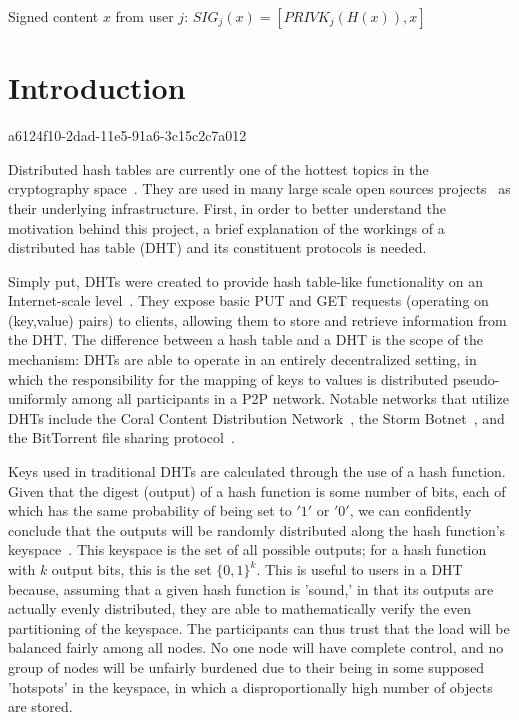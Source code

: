\documentclass[12pt]{article}
\begin{document}
Signed content $x$ from user $j$: $SIG_j(x) = \left[ PRIVK_j( H(x) ), x \right]$

\section{Introduction}
a6124f10-2dad-11e5-91a6-3c15c2c7a012\par Distributed hash tables are currently one of the hottest topics in the cryptography space~\cite{Stoica:2001dj,Rowstron:2001ea,Ratnasamy:2001wn}. They are used in many large scale open sources projects~\cite{Freitas:2013tb,Xu:2010vs,Perfitt:2010fh} as their underlying infrastructure. First, in order to better understand the motivation behind this project, a brief explanation of the workings of a distributed has table (DHT) and its constituent protocols is needed.

\par Simply put, DHTs were created to provide hash table-like functionality on an Internet-scale level~\cite{Ratnasamy:2001wn}. They expose basic PUT and GET requests (operating on (key,value) pairs) to clients, allowing them to store and retrieve information from the DHT. The difference between a hash table and a DHT is the scope of the mechanism: DHTs are able to operate in an entirely decentralized setting, in which the responsibility for the mapping of keys to values is distributed pseudo-uniformly among all participants in a P2P network. Notable networks that utilize DHTs include the Coral Content Distribution Network~\cite{Freedman:2004vb}, the Storm Botnet~\cite{Holz:2008uk}, and the BitTorrent file sharing protocol~\cite{Cohen:y1_8mBnw}.

\par Keys used in traditional DHTs are calculated through the use of a hash function. Given that the digest (output) of a hash function is some number of bits, each of which has the same probability of being set to $'1'$ or $'0'$, we can confidently conclude that the outputs will be randomly distributed along the hash function's keyspace~. This keyspace is the set of all possible outputs; for a hash function with $k$ output bits, this is the set $\{0,1\}^k$. This is useful to users in a DHT because, assuming that a given hash function is 'sound,' in that its outputs are actually evenly distributed, they are able to mathematically verify the even partitioning of the keyspace. The participants can thus trust that the load will be balanced fairly among all nodes. No one node will have complete control, and no group of nodes will be unfairly burdened due to their being in some supposed 'hotspots' in the keyspace, in which a disproportionally high number of objects are stored.~
\end{document}
